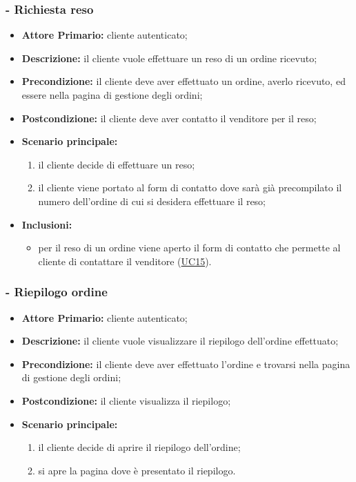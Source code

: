 \subsubsection{ - Richiesta reso}
\begin{itemize}
\item \textbf{Attore Primario:} cliente autenticato;
\item \textbf{Descrizione:} il cliente vuole effettuare un reso di un ordine ricevuto;
\item \textbf{Precondizione:} il cliente deve aver effettuato un ordine, averlo ricevuto, ed essere nella pagina di gestione degli ordini;
\item \textbf{Postcondizione:} il cliente deve aver contatto il venditore per il reso;
\item \textbf{Scenario principale:}
\begin{enumerate}
    \item il cliente decide di effettuare un reso;
    \item il cliente viene portato al form di contatto dove sarà già precompilato il numero dell'ordine di cui si desidera effettuare il reso;
\end{enumerate}
\item \textbf{Inclusioni:}
\begin{itemize}
    \item per il reso di un ordine viene aperto il form di contatto che permette al cliente di contattare il venditore (\hyperref[UC15]{UC15}).
\end{itemize}
\end{itemize}

\stepsubUserCase
\subsubsection{ - Riepilogo ordine}
\begin{itemize}
\item \textbf{Attore Primario:} cliente autenticato;
\item \textbf{Descrizione:} il cliente vuole visualizzare il riepilogo dell'ordine effettuato;
\item \textbf{Precondizione:} il cliente deve aver effettuato l'ordine e trovarsi nella pagina di gestione degli ordini;
\item \textbf{Postcondizione:} il cliente visualizza il riepilogo;
\item \textbf{Scenario principale:}
\begin{enumerate}
    \item il cliente decide di aprire il riepilogo dell'ordine;
    \item si apre la pagina dove è presentato il riepilogo.
\end{enumerate}
\end{itemize}

